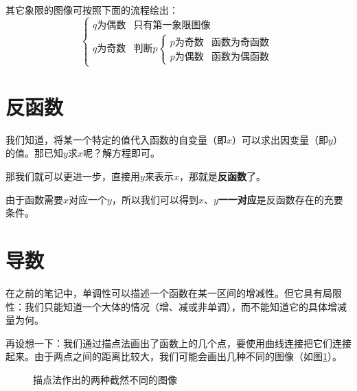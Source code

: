 其它象限的图像可按照下面的流程绘出：
\[\begin{cases}
	\text{$q$为偶数} & \text{只有第一象限图像} \\
	\text{$q$为奇数} & \text{判断$p$}
	\begin{cases}
		\text{$p$为奇数} & \text{函数为奇函数} \\
		\text{$p$为偶数} & \text{函数为偶函数}
	\end{cases}
\end{cases}\]

\section{反函数}
我们知道，将某一个特定的值代入函数的自变量（即$x$）可以求出因变量（即$y$）的值。那已知$y$求$x$呢？解方程即可。

那我们就可以更进一步，直接用$y$来表示$x$，那就是\textbf{反函数}了。

由于函数需要$x$对应一个$y$，所以我们可以得到$x$、$y$\textbf{一一对应}是反函数存在的充要条件。

\section{导数}\label{sec:mathsAnalysis-derivative}
在之前的笔记中，单调性可以描述一个函数在某一区间的增减性。但它具有局限性：我们只能知道一个大体的情况（增、减或非单调），而不能知道它的具体增减量为何。

再设想一下：我们通过描点法画出了函数上的几个点，要使用曲线连接把它们连接起来。由于两点之间的距离比较大，我们可能会画出几种不同的图像（如图\ref{fig:two-different-function-figure}）。

\begin{figure}[htb]
    \centering
    \caption{描点法作出的两种截然不同的图像}
    \label{fig:two-different-function-figure}
\end{figure}

